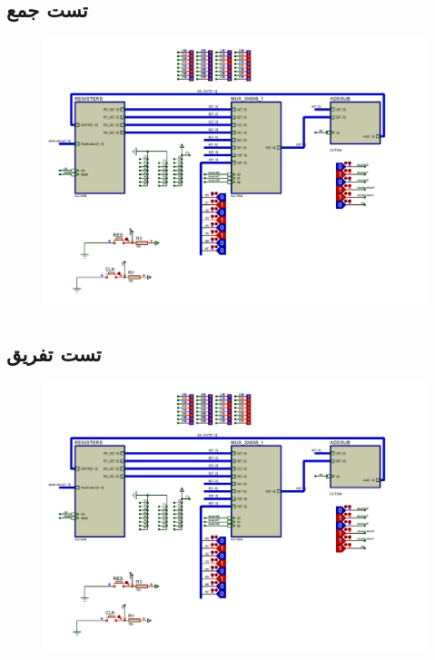 \documentclass{article}
\begin{document}
\subsection{تست جمع}
\begin{figure}[H]
	\centering
	\includegraphics[scale=0.5]{testadd}
\end{figure}
\subsection{تست تفریق}
\begin{figure}[H]
	\centering
	\includegraphics[scale=0.5]{testsub}
\end{figure}
\end{document}
